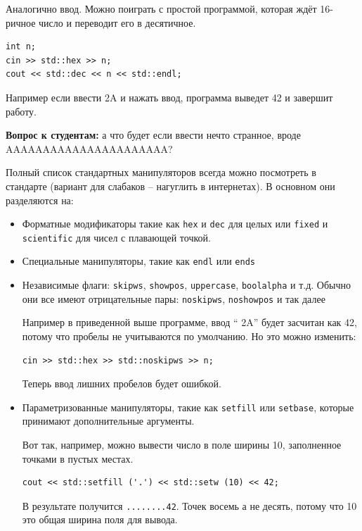 \documentclass[a4paper,12pt,oneside]{article}
\newif\ifanswers
\begin{document}
Аналогично ввод. Можно поиграть с простой программой, которая ждёт 16-ричное число и переводит его в десятичное.

\begin{lstlisting}
int n;
cin >> std::hex >> n;
cout << std::dec << n << std::endl;
\end{lstlisting}

Например если ввести 2A и нажать ввод, программа выведет 42 и завершит работу.

\textbf{Вопрос к студентам:} а что будет если ввести нечто странное, вроде AAAAAAAAAAAAAAAAAAAAAA?

\ifanswers
Будет поведение, зависящее от реализации. Как вариант вывод MAXINT, то есть чего-то вроде 2147483647.
\fi

Полный список стандартных манипуляторов всегда можно посмотреть в стандарте (вариант для слабаков -- нагуглить в интернетах). В основном они разделяются на:

\begin{itemize}
\item Форматные модификаторы такие как \lstinline!hex! и \lstinline!dec! для целых или \lstinline!fixed! и \lstinline!scientific! для чисел с плавающей точкой.

\item Специальные манипуляторы, такие как \lstinline!endl! или \lstinline!ends!

\item Независимые флаги: \lstinline!skipws!, \lstinline!showpos!, \lstinline!uppercase!, \lstinline!boolalpha! и т.д. Обычно они все имеют отрицательные пары: \lstinline!noskipws!, \lstinline!noshowpos! и так далее

Например в приведенной выше программе, ввод ``  2A'' будет засчитан как 42, потому что пробелы не учитываются по умолчанию. Но это можно изменить:

\begin{lstlisting}
cin >> std::hex >> std::noskipws >> n;
\end{lstlisting}

Теперь ввод лишних пробелов будет ошибкой.

\item Параметризованные манипуляторы, такие как \lstinline!setfill! или \lstinline!setbase!, которые принимают дополнительные аргументы.

Вот так, например, можно вывести число в поле ширины 10, заполненное точками в пустых местах.

\begin{lstlisting}
cout << std::setfill ('.') << std::setw (10) << 42;
\end{lstlisting}

В результате получится \lstinline!........42!. Точек восемь а не десять, потому что 10 это общая ширина поля для вывода.

\end{itemize}
\end{document}
